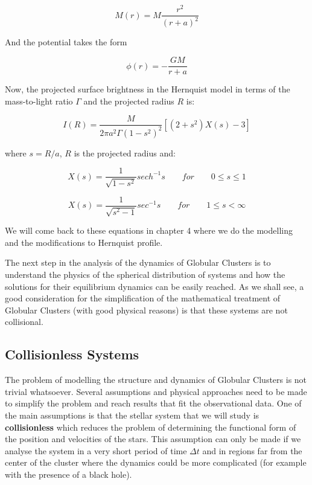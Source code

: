 \begin{equation}
M(r)=M\frac{r^{2}}{\left(r+a\right)^{2}}
\end{equation}  

And the potential takes the form

\begin{equation}
\phi(r)=-\frac{GM}{r+a}
\end{equation}

Now, the projected surface brightness in the Hernquist model in terms of the mass-to-light ratio $\Gamma$ and the projected radius $R$ is: 
 
\begin{equation}
I(R)=\frac{M}{2\pi a^{2}\Gamma\left(1-s^{2}\right)^{2}}\left[\left(2+s^{2}\right)X(s)-3\right]
\end{equation}
 
where $s=R/a$, $R$ is the projected radius and:

\begin{equation}
X(s)=\frac{1}{\sqrt{1-s^{2}}}sech^{-1}s\qquad for\qquad0\leq s\leq1
\end{equation}

\begin{equation}
X(s)=\frac{1}{\sqrt{s^{2}-1}}sec^{-1}s\qquad for\qquad1\leq s<\infty
\end{equation}

We will come back to these equations in chapter 4 where we do the modelling and the modifications to Hernquist profile.

The next step in the analysis of the dynamics of Globular Clusters is to understand the physics of the spherical distribution of systems and how the solutions for their equilibrium dynamics can be easily reached. As we shall see, a good consideration for the simplification of the mathematical treatment of Globular Clusters (with good physical reasons) is that these systems are not collisional.

\subsection{Collisionless Systems}

The problem of modelling the structure and dynamics of Globular Clusters is not trivial whatsoever. Several assumptions and physical approaches need to be made to simplify the problem and reach results that fit the observational data. One of the main assumptions is that the stellar system that we will study is \textbf{collisionless} which reduces the problem of determining the functional form of the position and velocities of the stars. This assumption can only be made if we analyse the system in a very short period of time $\Delta t$ and in regions far from the center of the cluster where the dynamics could be more complicated (for example with the presence of a black hole).

